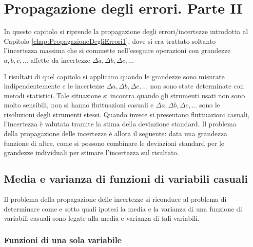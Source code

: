 \chapter{Propagazione degli errori. Parte II}
\label{chap:PropagazioneDegliErrori2}
\mt

In questo capitolo si riprende la propagazione degli errori/incertezze
introdotta al Capitolo \ref{chap:PropagazioneDegliErrori1}, dove si era trattato
soltanto l'incertezza massima che si commette nell'eseguire operazioni con
grandezze $a, b, c, \ldots$ affette da incertezze
$\Delta a, \Delta b, \Delta c, \ldots$

I risultati di quel capitolo si applicano quando le grandezze sono
misurate indipendentemente e le incertezze
$\Delta a, \Delta b, \Delta c, \ldots$ non sono state determinate
con metodi statistici.
Tale situazione si incontra quando gli strumenti usati non sono
molto sensibili, non si hanno fluttuazioni casuali e
$\Delta a, \Delta b, \Delta c, \ldots$
sono le risoluzioni degli strumenti stessi. Quando invece si
presentano fluttuazioni casuali, l'incertezza \`e valutata tramite la stima
della deviazione standard. Il problema della propagazione delle
incertezze \`e allora il seguente: data una grandezza funzione di altre,
come si possono combinare le deviazioni standard per le
grandezze individuali per stimare l'incertezza sul risultato.


\section{Media e varianza di funzioni di variabili casuali}
Il problema della propagazione delle incertezze si riconduce al
problema di determinare come e sotto quali ipotesi la media
e la varianza di una funzione di variabili casuali sono legate
alla media e varianza di tali variabili.

\subsection{Funzioni di una sola variabile}

